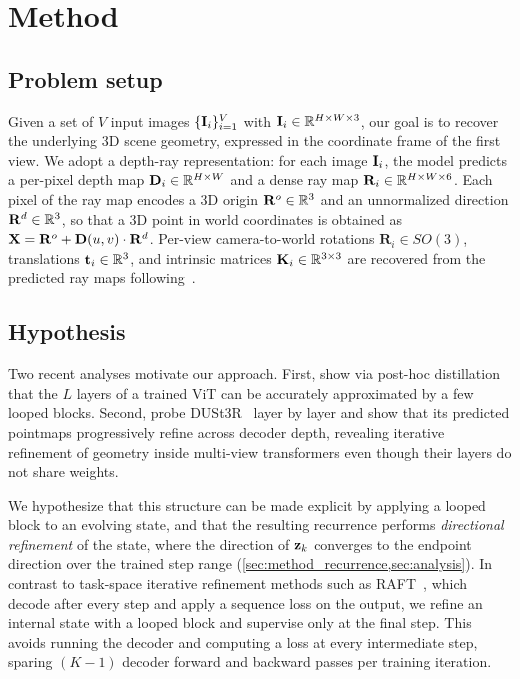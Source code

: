 







\section{Method}
\label{sec:method}



\subsection{Problem setup}
\label{sec:method_problem}
Given a set of $V$ input images $\{\mathbf{I}_i\}_{i=1}^{V}$ with $\mathbf{I}_i \in \mathbb{R}^{H \times W \times 3}$, our goal is to recover the underlying 3D scene geometry, expressed in the coordinate frame of the first view. We adopt a depth-ray representation: for each image $\mathbf{I}_i$, the model predicts a per-pixel depth map $\mathbf{D}_i \in \mathbb{R}^{H \times W}$ and a dense ray map $\mathbf{R}_i \in \mathbb{R}^{H \times W \times 6}$.
Each pixel of the ray map encodes a 3D origin $\mathbf{R}^o \in \mathbb{R}^3$ and an unnormalized direction $\mathbf{R}^d \in \mathbb{R}^3$, so that a 3D point in world coordinates is obtained as $\mathbf{X} = \mathbf{R}^o + \mathbf{D}(u,v) \cdot \mathbf{R}^d$.
Per-view camera-to-world rotations $\mathbf{R}_i \in SO(3)$, translations $\mathbf{t}_i \in \mathbb{R}^3$, and intrinsic matrices $\mathbf{K}_i \in \mathbb{R}^{3 \times 3}$ are recovered from the predicted ray maps following~\citet{lin2025depth}.


\subsection{Hypothesis}
\label{sec:hypothesis}

Two recent analyses motivate our approach.
First, \citet{jacobs2025raptor} show via post-hoc distillation that the $L$ layers of a trained ViT can be accurately approximated by a few looped blocks.
Second, \citet{stary2025understanding} probe DUSt3R~\citep{dust3r} layer by layer and show that its predicted pointmaps progressively refine across decoder depth, revealing iterative refinement of geometry inside multi-view transformers even though their layers do not share weights.

We hypothesize that this structure can be made explicit by applying a looped block to an evolving state, and that the resulting recurrence performs \emph{directional refinement} of the state, where the direction of $\mathbf{z}_k$ converges to the endpoint direction over the trained step range
(\cref{sec:method_recurrence,sec:analysis}).
In contrast to task-space iterative refinement methods such as RAFT~\citep{RAFT,lipson2021raft}, which decode after every step and apply a sequence loss on the output, we refine an internal state with a looped block and supervise only at the final step. This avoids running the decoder and computing a loss at every intermediate step, sparing $(K{-}1)$ decoder forward and backward passes per training iteration.

